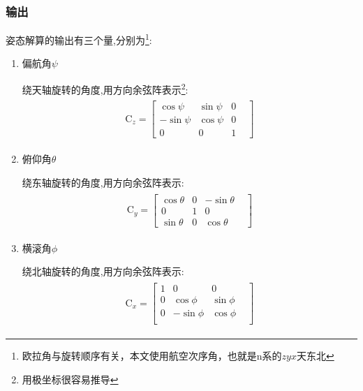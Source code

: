 \subsubsection{输出}
姿态解算的输出有三个量,分别为\footnote{欧拉角与旋转顺序有关，本文使用航空次序角，也就是n系的$zyx$天东北}:
\begin{enumerate}
    \item 偏航角$\psi$

        绕天轴旋转的角度,用方向余弦阵表示\footnote{用极坐标很容易推导\citep{二维旋转}}: 
        \begin{eqnarray}\label{偏航角方向余弦}
            \begin{split}
                \mathrm{C}_z=\left[\begin{matrix}
                         \cos{\psi} & \sin{\psi} & 0 & \\
                        -\sin{\psi} & \cos{\psi} & 0 & \\
                                 0 &          0 & 1 &
                \end{matrix}\right]
            \end{split}
        \end{eqnarray}
    \item 俯仰角$\theta$

        绕东轴旋转的角度,用方向余弦阵表示: 
        \begin{eqnarray}\label{俯仰角方向余弦}
            \begin{split}
                \mathrm{C}_y=\left[\begin{matrix}
                        \cos{\theta} & 0 & -\sin{\theta} & \\
                                   0 & 1 &           0 & \\
                        \sin{\theta} & 0 &  \cos{\theta} &
                \end{matrix}\right]
            \end{split}
        \end{eqnarray}
    \item 横滚角$\phi$

        绕北轴旋转的角度,用方向余弦阵表示: 
        \begin{eqnarray}\label{横滚角方向余弦}
            \begin{split}
                \mathrm{C}_x=\left[\begin{matrix}
                        1 &           0 &          0 & \\
                        0 &  \cos{\phi} & \sin{\phi} & \\
                        0 & -\sin{\phi} & \cos{\phi} & \\
                \end{matrix}\right]
            \end{split}
        \end{eqnarray}
\end{enumerate}

